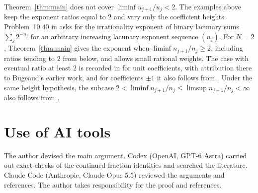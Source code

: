 \documentclass{amsart}
\numberwithin{equation}{section}
\begin{document}
Theorem~\ref{thm:main} does not cover
$\liminf u_{j+1}/u_j<2$. The examples above keep the exponent ratios
equal to $2$ and vary only the coefficient heights.
Problem~10.40 in \cite[p.~220]{Bu12} asks for the irrationality exponent
of binary lacunary sums $\sum_j2^{-n_j}$ for an arbitrary increasing
lacunary exponent sequence $(n_j)$. For $N=2$, Theorem~\ref{thm:main} gives the exponent when
$\liminf n_{j+1}/n_j\ge2$, including ratios tending to $2$ from below,
and allows small rational weights. The case with eventual ratio at least
$2$ is recorded in \cite{BKS} for unit coefficients, with attribution
there to Bugeaud's earlier work, and for coefficients $\pm1$ it also
follows from \cite[Theorem~1]{DKS}. Under the same height hypothesis, the
subcase $2<\liminf n_{j+1}/n_j\le\limsup n_{j+1}/n_j<\infty$ also follows
from \cite[Theorem~1]{DKS}.

\section*{Use of AI tools}

The author devised the main argument. Codex (OpenAI, GPT-6 Astra) carried
out exact checks of the continued-fraction identities and searched the literature.
Claude Code (Anthropic, Claude Opus 5.5) reviewed the arguments and
references. The author takes responsibility for the proof and references.
\end{document}
